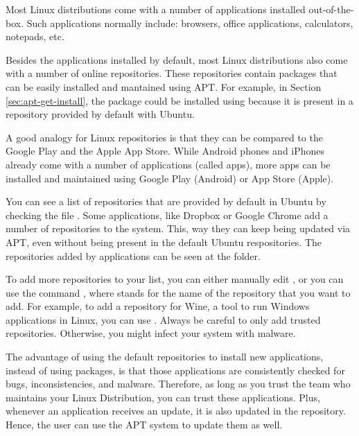 \begin{my_box}[Repositories]
\label{box:repositories}

Most Linux distributions come with a number of applications installed out-of-the-box. Such applications normally include: browsers, office applications, calculators, notepads, etc.

Besides the applications installed by default, most Linux distributions also come with a number of online repositories. These repositories contain packages that can be easily installed and mantained using \acs{APT}. For example, in  Section \ref{sec:apt-get-install}, the package  could be installed using  because it is present in a repository provided by default with Ubuntu.

A good analogy for Linux repositories is that they can be compared to the Google Play and the Apple App Store. While Android phones and iPhones already come with a number of applications (called apps), more apps can be installed and maintained using Google Play (Android) or App Store (Apple).

You can see a list of repositories that are provided by default in Ubuntu by checking the file . Some applications, like Dropbox or Google Chrome add a number of repositories to the system. This, way they can keep being updated via \acs{APT}, even without being present in the default Ubuntu respositories. The repositories added by applications can be seen at the  folder.

To add more repositories to your list, you can either manually edit , or you can use the command , where  stands for the name of the repository that you want to add. For example, to add a repository for Wine, a tool to run Windows applications in Linux, you can use . Always be careful to only add trusted repositories. Otherwise, you might infect your system with malware.

The advantage of using the default repositories to install new applications, instead of using  packages, is that those applications are consistently checked for bugs, inconsistencies, and malware. Therefore, as long as you trust the team who maintains your Linux Distribution, you can trust these applications. Plus, whenever an application receives an update, it is also updated in the repository. Hence, the user can use the \acs{APT} system to update them as well.
\end{my_box}

